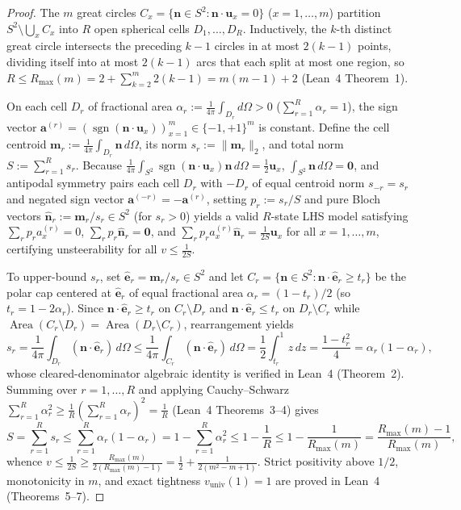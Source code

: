 \documentclass[11pt,a4paper]{article}
\theoremstyle{definition}
\theoremstyle{remark}
\newcommand{\sgn}{\operatorname{sgn}}
\begin{document}
\begin{proof}
The $m$ great circles $C_x = \{\mathbf{n} \in S^2 : \mathbf{n}\cdot \mathbf{u}_x = 0\}$ ($x=1,\dots,m$) partition $S^2 \setminus \bigcup_x C_x$ into $R$ open spherical cells $D_1,\dots,D_R$. Inductively, the $k$-th distinct great circle intersects the preceding $k-1$ circles in at most $2(k-1)$ points, dividing itself into at most $2(k-1)$ arcs that each split at most one region, so $R \le R_{\max}(m) = 2 + \sum_{k=2}^m 2(k-1) = m(m-1) + 2$ (Lean~4 Theorem~1).

On each cell $D_r$ of fractional area $\alpha_r := \frac{1}{4\pi}\int_{D_r} d\Omega > 0$ ($\sum_{r=1}^R \alpha_r = 1$), the sign vector $\mathbf{a}^{(r)} = (\sgn(\mathbf{n}\cdot \mathbf{u}_x))_{x=1}^m \in \{-1,+1\}^m$ is constant. Define the cell centroid $\mathbf{m}_r := \frac{1}{4\pi}\int_{D_r} \mathbf{n}\,d\Omega$, its norm $s_r := \|\mathbf{m}_r\|_2$, and total norm $S := \sum_{r=1}^R s_r$. Because $\frac{1}{4\pi}\int_{S^2} \sgn(\mathbf{n}\cdot \mathbf{u}_x)\mathbf{n}\,d\Omega = \frac{1}{2}\mathbf{u}_x$, $\int_{S^2}\mathbf{n}\,d\Omega = \mathbf{0}$, and antipodal symmetry pairs each cell $D_r$ with $-D_r$ of equal centroid norm $s_{-r} = s_r$ and negated sign vector $\mathbf{a}^{(-r)} = -\mathbf{a}^{(r)}$, setting $p_r := s_r / S$ and pure Bloch vectors $\hat{\mathbf{n}}_r := \mathbf{m}_r / s_r \in S^2$ (for $s_r > 0$) yields a valid $R$-state LHS model satisfying $\sum_r p_r a_x^{(r)} = 0$, $\sum_r p_r \hat{\mathbf{n}}_r = \mathbf{0}$, and $\sum_r p_r a_x^{(r)} \hat{\mathbf{n}}_r = \frac{1}{2S}\mathbf{u}_x$ for all $x=1,\dots,m$, certifying unsteerability for all $v \le \frac{1}{2S}$.

To upper-bound $s_r$, set $\hat{\mathbf{e}}_r = \mathbf{m}_r / s_r \in S^2$ and let $C_r = \{\mathbf{n} \in S^2 : \mathbf{n}\cdot \hat{\mathbf{e}}_r \ge t_r\}$ be the polar cap centered at $\hat{\mathbf{e}}_r$ of equal fractional area $\alpha_r = (1 - t_r)/2$ (so $t_r = 1 - 2\alpha_r$). Since $\mathbf{n}\cdot\hat{\mathbf{e}}_r \ge t_r$ on $C_r \setminus D_r$ and $\mathbf{n}\cdot\hat{\mathbf{e}}_r \le t_r$ on $D_r \setminus C_r$ while $\operatorname{Area}(C_r\setminus D_r) = \operatorname{Area}(D_r\setminus C_r)$, rearrangement yields
\[
  s_r = \frac{1}{4\pi}\int_{D_r} (\mathbf{n}\cdot \hat{\mathbf{e}}_r)\,d\Omega
      \le \frac{1}{4\pi}\int_{C_r} (\mathbf{n}\cdot \hat{\mathbf{e}}_r)\,d\Omega
      = \frac{1}{2}\int_{t_r}^1 z\,dz = \frac{1 - t_r^2}{4} = \alpha_r(1 - \alpha_r),
\]
whose cleared-denominator algebraic identity is verified in Lean~4 (Theorem~2). Summing over $r=1,\dots,R$ and applying Cauchy--Schwarz $\sum_{r=1}^R \alpha_r^2 \ge \frac{1}{R}(\sum_{r=1}^R \alpha_r)^2 = \frac{1}{R}$ (Lean~4 Theorems~3--4) gives
\[
  S = \sum_{r=1}^R s_r \le \sum_{r=1}^R \alpha_r(1-\alpha_r) = 1 - \sum_{r=1}^R \alpha_r^2 \le 1 - \frac{1}{R} \le 1 - \frac{1}{R_{\max}(m)} = \frac{R_{\max}(m)-1}{R_{\max}(m)},
\]
whence $v \le \frac{1}{2S} \ge \frac{R_{\max}(m)}{2(R_{\max}(m)-1)} = \frac{1}{2} + \frac{1}{2(m^2-m+1)}$. Strict positivity above $1/2$, monotonicity in $m$, and exact tightness $v_{\mathrm{univ}}(1)=1$ are proved in Lean~4 (Theorems~5--7).
\end{proof}
\end{document}
